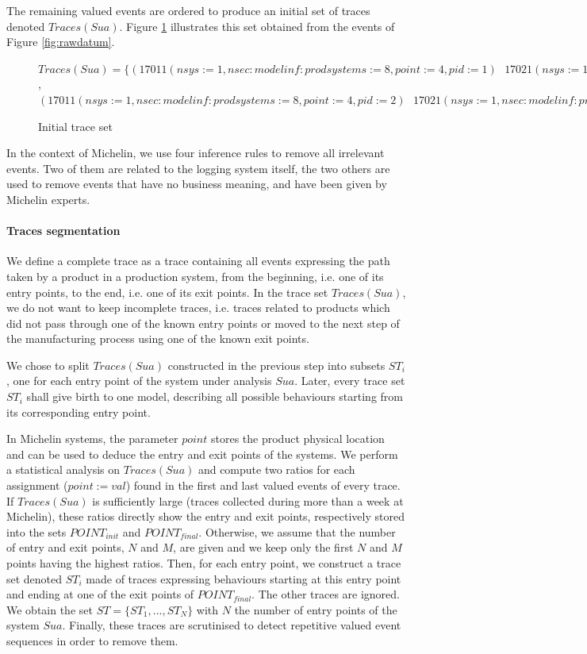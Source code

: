 The remaining valued events are ordered to produce an initial set
of traces denoted $Traces(Sua)$. Figure \ref{fig:tsua}
illustrates this set obtained from the events of Figure
\ref{fig:rawdatum}.

\begin{figure}
    $Traces(Sua) = \{
    (17011(nsys:=1,nsec:modelinf:prodsystems:=8,point:=4,pid:=1)\text{ }
    17021(nsys:=1,nsec:modelinf:prodsystems:=8,point:=4,tpoint:=8,pid:=1))$,
    $(17011(nsys:=1,nsec:modelinf:prodsystems:=8,point:=4,pid:=2)\text{ }
    17021(nsys:=1,nsec:modelinf:prodsystems:=8,point:=4,tpoint:=8,pid:=2)) \}$

    \caption{Initial trace set}
    \label{fig:tsua}
\end{figure}

In the context of Michelin, we use four inference rules to remove
all irrelevant events. Two of them are related to the logging
system itself, the two others are used to remove events that have
no business meaning, and have been given by Michelin experts.

\paragraph{Traces segmentation}

We define a complete trace as a trace containing all events
expressing the path taken by a product in a production system,
from the beginning, i.e. one of its entry points, to the end,
i.e. one of its exit points. In the trace set $Traces(Sua)$, we
do not want to keep incomplete traces, i.e. traces related to
products which did not pass through one of the known entry points
or moved to the next step of the manufacturing process using one
of the known exit points.

We chose to split $Traces(Sua)$ constructed in the previous step
into subsets $ST_i$, one for each entry point of the system under
analysis $Sua$. Later, every trace set $ST_i$ shall give birth to
one model, describing all possible behaviours starting from its
corresponding entry point.

In Michelin systems, the parameter $point$ stores the product
physical location and can be used to deduce the entry and exit
points of the systems. We perform a statistical analysis
on $Traces(Sua)$ and compute two ratios for each assignment
($point:=val$) found in the first and last valued events of every
trace. If $Traces(Sua)$ is sufficiently large (traces collected
during more than a week at Michelin), these ratios directly show
the entry and exit points, respectively stored into the sets
$POINT_{init}$ and $POINT_{final}$. Otherwise, we assume that the
number of entry and exit points, $N$ and $M$, are given and we
keep only the first $N$ and $M$ points having the highest ratios.
Then, for each entry point, we construct a trace set denoted
$ST_i$ made of traces expressing behaviours starting at this
entry point and ending at one of the exit points of
$POINT_{final}$. The other traces are ignored. We obtain the
set $ST=\{ST_1,...,ST_N\}$ with $N$ the number of entry points of
the system $Sua$. Finally, these traces are scrutinised to detect
repetitive valued event sequences in order to remove them.

